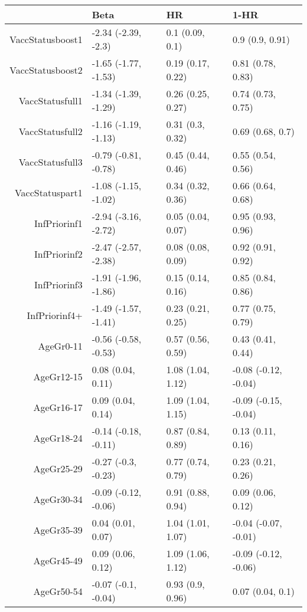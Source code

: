 \begin{table}[ht]
\centering
\begin{tabular}{rlll}
  \hline
 & Beta & HR & 1-HR \\ 
  \hline
VaccStatusboost1 & -2.34 (-2.39, -2.3) & 0.1 (0.09, 0.1) & 0.9 (0.9, 0.91) \\ 
  VaccStatusboost2 & -1.65 (-1.77, -1.53) & 0.19 (0.17, 0.22) & 0.81 (0.78, 0.83) \\ 
  VaccStatusfull1 & -1.34 (-1.39, -1.29) & 0.26 (0.25, 0.27) & 0.74 (0.73, 0.75) \\ 
  VaccStatusfull2 & -1.16 (-1.19, -1.13) & 0.31 (0.3, 0.32) & 0.69 (0.68, 0.7) \\ 
  VaccStatusfull3 & -0.79 (-0.81, -0.78) & 0.45 (0.44, 0.46) & 0.55 (0.54, 0.56) \\ 
  VaccStatuspart1 & -1.08 (-1.15, -1.02) & 0.34 (0.32, 0.36) & 0.66 (0.64, 0.68) \\ 
  InfPriorinf1 & -2.94 (-3.16, -2.72) & 0.05 (0.04, 0.07) & 0.95 (0.93, 0.96) \\ 
  InfPriorinf2 & -2.47 (-2.57, -2.38) & 0.08 (0.08, 0.09) & 0.92 (0.91, 0.92) \\ 
  InfPriorinf3 & -1.91 (-1.96, -1.86) & 0.15 (0.14, 0.16) & 0.85 (0.84, 0.86) \\ 
  InfPriorinf4+ & -1.49 (-1.57, -1.41) & 0.23 (0.21, 0.25) & 0.77 (0.75, 0.79) \\ 
  AgeGr0-11 & -0.56 (-0.58, -0.53) & 0.57 (0.56, 0.59) & 0.43 (0.41, 0.44) \\ 
  AgeGr12-15 & 0.08 (0.04, 0.11) & 1.08 (1.04, 1.12) & -0.08 (-0.12, -0.04) \\ 
  AgeGr16-17 & 0.09 (0.04, 0.14) & 1.09 (1.04, 1.15) & -0.09 (-0.15, -0.04) \\ 
  AgeGr18-24 & -0.14 (-0.18, -0.11) & 0.87 (0.84, 0.89) & 0.13 (0.11, 0.16) \\ 
  AgeGr25-29 & -0.27 (-0.3, -0.23) & 0.77 (0.74, 0.79) & 0.23 (0.21, 0.26) \\ 
  AgeGr30-34 & -0.09 (-0.12, -0.06) & 0.91 (0.88, 0.94) & 0.09 (0.06, 0.12) \\ 
  AgeGr35-39 & 0.04 (0.01, 0.07) & 1.04 (1.01, 1.07) & -0.04 (-0.07, -0.01) \\ 
  AgeGr45-49 & 0.09 (0.06, 0.12) & 1.09 (1.06, 1.12) & -0.09 (-0.12, -0.06) \\ 
  AgeGr50-54 & -0.07 (-0.1, -0.04) & 0.93 (0.9, 0.96) & 0.07 (0.04, 0.1) \\ 

\end{tabular}
\end{table}
